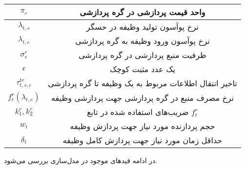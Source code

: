 \begin{table}[h]
\begin{tabularx}{\textwidth}{|c|C|}
			$\pi_c$        	 	& واحد قیمت پردازشی در گره پردازشی  \\ \hline                                                        
			$\lambda_{t,s}$ 	& نرخ پوآسون تولید وظیفه در حسگر \\ \hline
			$\lambda_{t,c}$ 	& نرخ پوآسون ورود وظیفه به گره پردازشی \\ \hline
			$\sigma_c^r$ 		& ظرفیت منبع پردازشی در گره پردازشی \\ \hline
			$\epsilon$ 			& یک عدد مثبت کوچک \\ \hline
			$\tau_{t,s,c}^{tr}$ & تاخیر انتقال اطلاعات مربوط به یک وظیفه تا گره پردازشی \\ \hline
			$f_t^r(\lambda_{t,e})$ 	& نرخ مصرف منبع در گره پردازشی جهت پردازشی وظیفه \\ \hline
			$k_1^r, k_2^r$ 			& ضریب‌های استفاده شده در تابع $f_t^r$ \\ \hline
			$w_t$ 				& حجم پردازنده مورد نیاز جهت پردازش وظیفه  \\ \hline
			$\delta_t$ 			& حداقل زمان مورد نیاز جهت پردازش کامل وظیفه \\ \hline
		\end{tabularx}
		\label{tbl:system_model:notation}
	\end{table}
	
	در ادامه قیدهای موجود در مدل‌سازی بررسی می‌شود. 
